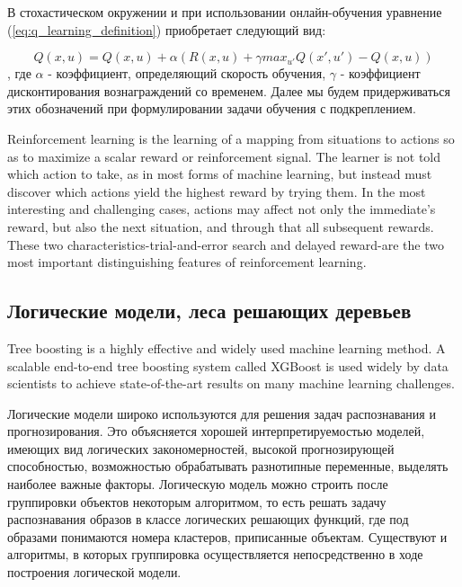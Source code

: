 В стохастическом окружении и при использовании онлайн-обучения уравнение (\ref{eq:q_learning_definition}) приобретает следующий вид:

\begin{equation}
    \label{eq:q_learning_online_stochastic}
    Q(x, u) = Q(x, u) + \alpha(R(x, u) + \gamma max_{u'} Q(x', u') − Q(x, u))
\end{equation},
где $\alpha$ - коэффициент, определяющий скорость обучения, $\gamma$ - коэффициент дисконтирования вознаграждений со временем. Далее мы будем придерживаться этих обозначений при формулировании задачи обучения с подкреплением.



\cite{лаптев2011применение, Magnusson:2012:SCW:2351316.2351327, hung2006applying, nelson2008exploiting, arisholm2007data, nguyen2012timely}
Reinforcement learning is the learning of a mapping from situations to actions so as to maximize a scalar reward or reinforcement signal. The learner is not told which action to take, as in most forms of machine learning, but instead must discover which actions yield the highest reward by trying them. In the most interesting and challenging cases, actions may affect not only the immediate's reward, but also the next situation, and through that all subsequent rewards. These two characteristics-trial-and-error search and delayed reward-are the two most important distinguishing features of reinforcement learning. \cite{book:963927, sutton1998introduction}



\subsection{Логические модели, леса решающих деревьев}
Tree boosting is a highly effective and widely used machine learning method. A scalable end-to-end tree boosting system called XGBoost is used widely by data scientists to achieve state-of-the-art results on many machine learning challenges. \cite{DBLP:journals/corr/ChenG16}

Логические модели широко используются \cite{бериков2008современные} для решения задач распознавания и прогнозирования. Это объясняется хорошей интерпретируемостью моделей, имеющих вид логических закономерностей, высокой прогнозирующей способностью, возможностью обрабатывать разнотипные переменные, выделять наиболее важные факторы. Логическую модель можно строить после группировки объектов некоторым алгоритмом, то есть решать задачу распознавания образов в классе логических решающих функций, где под образами понимаются номера кластеров, приписанные объектам. Существуют и алгоритмы, в которых группировка осуществляется непосредственно в ходе построения логической модели.

